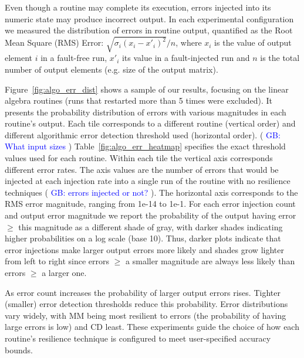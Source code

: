 \documentclass[10pt, conference, compsocconf]{IEEEtran}
\newcommand{\greg}[1]{%
  \textcolor{blue}{GB: #1}
}
\begin{document}
Even though a routine may complete its execution, errors injected into its numeric state may produce incorrect output.
In each experimental configuration we measured the distribution of errors in routine output, quantified as the Root Mean Square (RMS) Error: $\sqrt{\sigma_i (x_i-x'_i)^2}/n$, where $x_i$ is the value of output element $i$ in a fault-free run, $x'_i$ its value in a fault-injected run and $n$ is the total number of output elements (e.g. size of the output matrix).

Figure~\ref{fig:algo_err_dist} shows a sample of our results, focusing on the linear algebra routines (runs that restarted more than 5 times were excluded).
It presents the probability distribution of errors with various magnitudes in each routine's output.
Each tile corresponds to a different routine (vertical order) and different algorithmic error detection threshold used (horizontal order). (\greg{What input sizes})
Table~\ref{fig:algo_err_heatmap} specifies the exact threshold values used for each routine.
Within each tile the vertical axis corresponds different error rates.
The axis values are the number of errors that would be injected at each injection rate into a single run of the routine with no resilience techniques (\greg{errors injected or not?}).
The horizontal axis corresponds to the RMS error magnitude, ranging from 1e-14 to 1e-1.
For each error injection count and output error magnitude we report the probability of the output having error $\ge$ this magnitude as a different shade of gray, with darker shades indicating higher probabilities on a log scale (base 10).
Thus, darker plots indicate that error injections make larger output errors more likely and shades grow lighter from left to right since errors $\ge$ a smaller magnitude are always less likely than errors $\ge$ a larger one.

As error count increases the probability of larger output errors rises.
Tighter (smaller) error detection thresholds reduce this probability.
Error distributions vary widely, with MM being most resilient to errors (the probability of having large errors is low) and CD least.
These experiments guide the choice of how each routine's resilience technique is configured to meet user-specified accuracy bounds.
\end{document}
